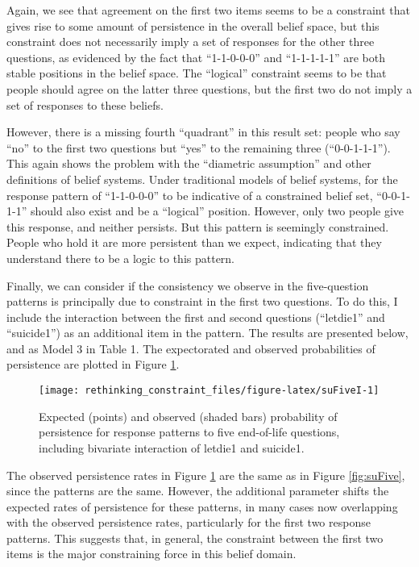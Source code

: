 \documentclass[12pt,]{article}
\begin{document}
Again, we see that agreement on the first two items seems to be a constraint that gives rise to some amount of persistence in the overall belief space, but this constraint does not necessarily imply a set of responses for the other three questions, as evidenced by the fact that ``1-1-0-0-0'' and ``1-1-1-1-1'' are both stable positions in the belief space. The ``logical'' constraint seems to be that people should agree on the latter three questions, but the first two do not imply a set of responses to these beliefs.

However, there is a missing fourth ``quadrant'' in this result set: people who say ``no'' to the first two questions but ``yes'' to the remaining three (``0-0-1-1-1''). This again shows the problem with the ``diametric assumption'' and other definitions of belief systems. Under traditional models of belief systems, for the response pattern of ``1-1-0-0-0'' to be indicative of a constrained belief set, ``0-0-1-1-1'' should also exist and be a ``logical'' position. However, only two people give this response, and neither persists. But this pattern is seemingly constrained. People who hold it are more persistent than we expect, indicating that they understand there to be a logic to this pattern.

Finally, we can consider if the consistency we observe in the five-question patterns is principally due to constraint in the first two questions. To do this, I include the interaction between the first and second questions (``letdie1'' and ``suicide1'') as an additional item in the pattern. The results are presented below, and as Model 3 in Table 1. The expectorated and observed probabilities of persistence are plotted in Figure \ref{fig:suFiveI}.

\begin{figure}[t]
\texttt{[image: rethinking\_constraint\_files/figure-latex/suFiveI-1]} \caption{Expected (points) and observed (shaded bars) probability of persistence for response patterns to five end-of-life questions, including bivariate interaction of letdie1 and suicide1.}\label{fig:suFiveI}
\end{figure}

The observed persistence rates in Figure \ref{fig:suFiveI} are the same as in Figure \ref{fig:suFive}, since the patterns are the same. However, the additional parameter shifts the expected rates of persistence for these patterns, in many cases now overlapping with the observed persistence rates, particularly for the first two response patterns. This suggests that, in general, the constraint between the first two items is the major constraining force in this belief domain.
\end{document}
